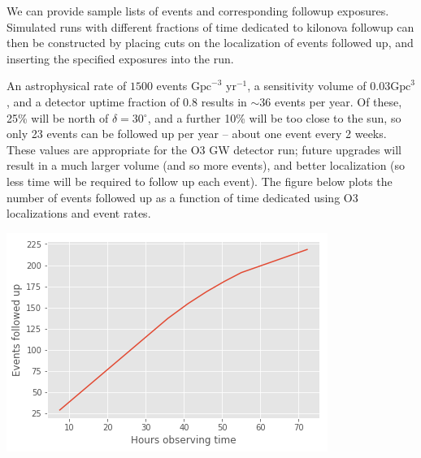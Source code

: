 \documentclass[a4paper,10pt]{article}
\newcommand{\degree}{\ensuremath{^{\circ}}}
\begin{document}
We can provide sample lists of events and corresponding followup exposures. Simulated runs with different fractions of time dedicated to kilonova followup can then be constructed by placing cuts on the localization of events followed up, and inserting the specified exposures into the run.

An astrophysical rate of $1500$ events $\mbox{Gpc}^{-3}$ $\mbox{yr}^{-1}$, a sensitivity volume of $0.03 \mbox{Gpc}^3$, and a detector uptime fraction of $0.8$ results in $\sim 36$ events per year. Of these, 25\% will be north of $\delta=30\degree$, and a further 10\% will be too close to the sun, so only 23 events can be followed up per year -- about one event every 2 weeks. These values are appropriate for the O3 GW detector run; future upgrades will result in a much larger volume (and so more events), and better localization (so less time will be required to follow up each event). The figure below plots the number of events followed up as a function of time dedicated using O3 localizations and event rates. 


\begin{minipage}{\columnwidth}
\centering
 \includegraphics[width=0.5\columnwidth]{gwtoofollowupsvstime.png}
 \label{fig:followupsvstime}
\end{minipage}

\end{document}
